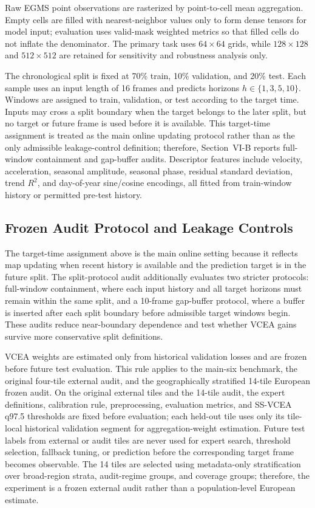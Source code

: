 \documentclass[lettersize,journal]{IEEEtran}
\begin{document}
Raw EGMS point observations are rasterized by point-to-cell mean aggregation. Empty cells are filled with nearest-neighbor values only to form dense tensors for model input; evaluation uses valid-mask weighted metrics so that filled cells do not inflate the denominator. The primary task uses $64\times64$ grids, while $128\times128$ and $512\times512$ are retained for sensitivity and robustness analysis only.

The chronological split is fixed at 70\% train, 10\% validation, and 20\% test. Each sample uses an input length of 16 frames and predicts horizons $h\in\{1,3,5,10\}$. Windows are assigned to train, validation, or test according to the target time. Inputs may cross a split boundary when the target belongs to the later split, but no target or future frame is used before it is available. This target-time assignment is treated as the main online updating protocol rather than as the only admissible leakage-control definition; therefore, Section~VI-B reports full-window containment and gap-buffer audits. Descriptor features include velocity, acceleration, seasonal amplitude, seasonal phase, residual standard deviation, trend $R^2$, and day-of-year sine/cosine encodings, all fitted from train-window history or permitted pre-test history.

\subsection{Frozen Audit Protocol and Leakage Controls}
The target-time assignment above is the main online setting because it reflects map updating when recent history is available and the prediction target is in the future split. The split-protocol audit additionally evaluates two stricter protocols: full-window containment, where each input history and all target horizons must remain within the same split, and a 10-frame gap-buffer protocol, where a buffer is inserted after each split boundary before admissible target windows begin. These audits reduce near-boundary dependence and test whether VCEA gains survive more conservative split definitions.

VCEA weights are estimated only from historical validation losses and are frozen before future test evaluation. This rule applies to the main-six benchmark, the original four-tile external audit, and the geographically stratified 14-tile European frozen audit. On the original external tiles and the 14-tile audit, the expert definitions, calibration rule, preprocessing, evaluation metrics, and SS-VCEA q97.5 thresholds are fixed before evaluation; each held-out tile uses only its tile-local historical validation segment for aggregation-weight estimation. Future test labels from external or audit tiles are never used for expert search, threshold selection, fallback tuning, or prediction before the corresponding target frame becomes observable. The 14 tiles are selected using metadata-only stratification over broad-region strata, audit-regime groups, and coverage groups; therefore, the experiment is a frozen external audit rather than a population-level European estimate.
\end{document}
